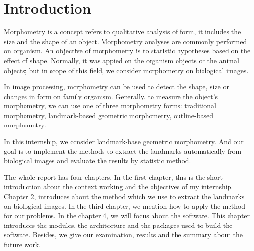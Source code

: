 \chapter*{Introduction}
Morphometry is a concept refers to qualitative analysis of form, it includes the size and the shape of an object. Morphometry analyses are commonly performed on organism. An objective of morphometry is to statistic hypotheses based on the effect of shape. Normally, it was appied on the organism objects or the animal objects; but in scope of this field, we consider morphometry on biological images.

In image processing, morphometry can be used to detect the shape, size or changes in form on family organism.  Generally, to measure the object's morphometry, we can use one of three morphometry forms: traditional morphometry, landmark-based geometric morphometry, outline-based morphometry.  

In this internship, we consider landmark-base geometric morphometry. And our goal is to implement the methods to extract the landmarks automatically from biological images and evaluate the results by statistic method.

The whole report has four chapters. In the first chapter, this is the short introduction about the context working and the objectives of my internship. Chapter 2, introduces about the method which we use to extract the landmarks on biological images. In the third chapter, we mention how to apply the method for our problems. In the chapter 4, we will focus about the software. This chapter introduces the modules, the architecture and the packages used to build the software. Besides, we give our examination, results and the summary about the future work.